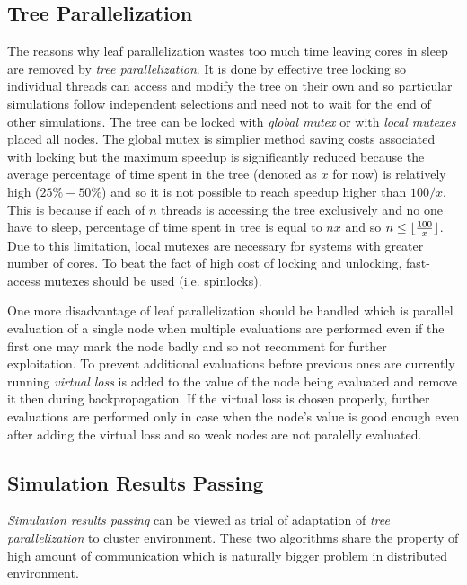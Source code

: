 \subsection{Tree Parallelization}


The reasons why leaf parallelization wastes too much time leaving cores in sleep are removed by
\emph{tree parallelization}. It is done by effective tree locking so individual threads can access
and modify the tree on their own and so particular simulations follow independent selections and
need not to wait for the end of other simulations. The tree can be locked with \emph{global mutex}
or with \emph{local mutexes} placed all nodes. The global mutex is simplier method saving costs
associated with locking but the maximum speedup is significantly reduced because the average
percentage of time spent in the tree (denoted as $x$ for now) is relatively high ($25\%-50\%$) and
so it is not possible to reach speedup higher than $100/x$. This is because if each of $n$
threads is
accessing the tree exclusively and no one have to sleep, percentage of time spent in 
tree is
equal to $n x$ and so $n \le \lfloor {100 \over{x}} \rfloor$. Due to this limitation, local mutexes
are necessary for systems with greater number of cores. To beat the fact of high cost of locking and
unlocking, fast-access mutexes should be used (i.e. spinlocks).

One more disadvantage of leaf parallelization should be handled which is parallel evaluation of a
single node when multiple evaluations are performed even if the first one may mark the node badly
and so not recomment for further exploitation. To prevent additional evaluations before previous
ones are currently running \emph{virtual loss} is added to the value of the node being evaluated
and remove it then during backpropagation.
If the virtual loss is chosen properly, further evaluations are performed only in case when the
node's value is good enough even after adding the virtual loss and so weak nodes are not paralelly
evaluated.

\subsection{Simulation Results Passing}
\label{sec_simulation_passing}


\emph{Simulation results passing} can be viewed as trial of adaptation of \emph{tree
parallelization} to cluster environment. These two algorithms share the property of high amount of
communication which is naturally bigger problem in distributed environment.

